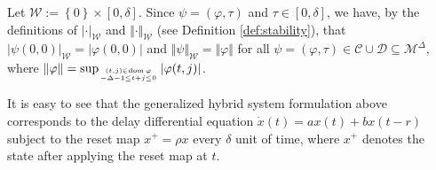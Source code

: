 \documentclass[journal,final,twocolumn]{IEEEtran}
\theoremstyle{definition}
\begin{document}
Let ${\mathcal{W}}:={\left\{{0}\right\}}\times[0,\delta]$. Since $\psi=({\varphi},\tau)$ and $\tau\in [0,\delta]$, we have, by the definitions of ${\left\vert{\cdot}\right\vert}_{\mathcal{W}}$ and ${\Vert{\cdot}\Vert}_{\mathcal{W}}$ (see Definition \ref{def:stability}), that ${\left\vert{\psi(0,0)}\right\vert}_{\mathcal{W}}={\left\vert{{\varphi}(0,0)}\right\vert}$ and ${\Vert{\psi}\Vert}_{\mathcal{W}}={\Vert{\varphi}\Vert}$ for all $\psi=({\varphi},\tau)\in{\mathcal{C}}\cup{\mathcal{D}}{\subseteq}{\mathcal{M}^{\Delta}}$, where ${\Vert{\varphi}\Vert}=\sup_{(t,j)\in{\text{dom}\,}{\varphi}\atop -\Delta-1\le t+j\le 0}{\left\vert{{\varphi}(t,j)}\right\vert}$.

It is easy to see that the generalized hybrid system formulation above corresponds to the delay differential equation
$
\dot{x}(t)=ax(t)+bx(t-r)
$
subject to the reset map $x^+=\rho x$ every $\delta$ unit of time, where $x^+$ denotes the state after applying the reset map at $t$.
\end{document}
